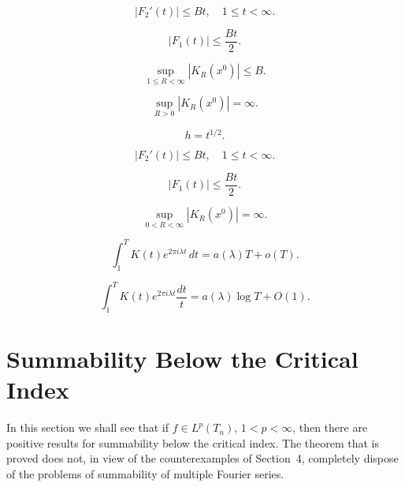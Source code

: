 \begin{equation}\label{eq:c7-4-21}
|F_2'(t)| \leq B t, \quad 1 \leq t < \infty.
\end{equation}

\begin{equation}\label{eq:c7-4-22}
|F_1(t)| \leq \frac{B t}{2}.
\end{equation}

\begin{equation}\label{eq:c7-4-23}
\sup_{1 \leq R < \infty} |K_R(x^0)| \leq B.
\end{equation}

\begin{equation}\tag{4.23$'$}\label{eq:c7-4-23p}
\sup_{R > 0} |K_R(x^0)| = \infty.
\end{equation}

\begin{equation}\label{eq:c7-4-24}
h = t^{1/2}.
\end{equation}

\begin{equation}\label{eq:c7-4-25}
|F_2'(t)| \leq B t, \quad 1 \leq t < \infty.
\end{equation}

\begin{equation}\label{eq:c7-4-26}
|F_1(t)| \leq \frac{B t}{2}.
\end{equation}

\begin{equation}\label{eq:c7-4-27}
\sup_{0 < R < \infty} |K_R(x^0)| = \infty.
\end{equation}

\begin{equation}\label{eq:c7-4-28}
\int_1^T K(t) e^{2\pi i \lambda t}\,dt = a(\lambda) T + o(T).
\end{equation}

\begin{equation}\label{eq:c7-4-29}
\int_1^T K(t) e^{2\pi i \lambda t} \frac{dt}{t} = a(\lambda) \log T + O(1).
\end{equation}

\section{Summability Below the Critical Index}

In this section we shall see that if $f \in L^p(T_n)$, $1 < p < \infty$, then there are positive results for summability below the critical index. The theorem that is proved does not, in view of the counterexamples of Section~4, completely dispose of the problems of summability of multiple Fourier series.

